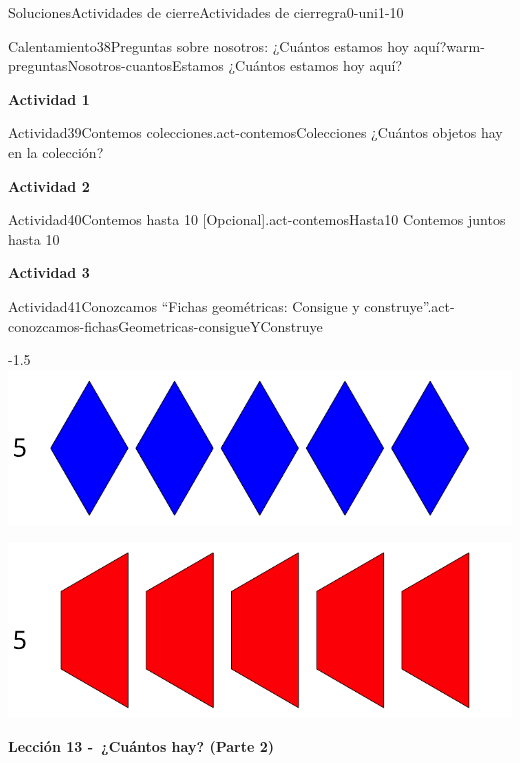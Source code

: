 \documentclass[twoside,10pt,]{article}
\begin{document}
\begin{solutions-section}{Soluciones}{Actividades de cierre}{}{Actividades de cierre}{}{}{gra0-uni1-10}
\begin{explorationsolution}{Calentamiento}{38}{Preguntas sobre nosotros: ¿Cuántos estamos hoy aquí?}{warm-preguntasNosotros-cuantosEstamos}
¿Cuántos estamos hoy aquí?%
\end{explorationsolution}%
\par\medskip
\noindent\textbf{\large{}\space\textperiodcentered\space{}Actividad 1}
\begin{activitysolution}{Actividad}{39}{Contemos colecciones.}{act-contemosColecciones}%
¿Cuántos objetos hay en la colección?%
\end{activitysolution}%
\par\medskip
\noindent\textbf{\large{}\space\textperiodcentered\space{}Actividad 2}
\begin{activitysolution}{Actividad}{40}{Contemos hasta 10 [Opcional].}{act-contemosHasta10}%
Contemos juntos hasta 10%
\end{activitysolution}%
\par\medskip
\noindent\textbf{\large{}\space\textperiodcentered\space{}Actividad 3}
\begin{activitysolution}{Actividad}{41}{Conozcamos “Fichas geométricas: Consigue y construye”.}{act-conozcamos-fichasGeometricas-consigueYConstruye}%
\begin{image}{0}{1}{0}{-1.5\baselineskip}%
\includegraphics[width=\linewidth]{external/svg-source/tikz-file-148183.pdf}
\end{image}%
\begin{image}{0}{1}{0}{}%
\includegraphics[width=\linewidth]{external/svg-source/tikz-file-148184.pdf}
\end{image}%
\end{activitysolution}%
\par\medskip
\noindent\textbf{\large{}\space\textperiodcentered\space{}Lección 13 -~¿Cuántos hay? (Parte 2)\\
}
\end{solutions-section}
\end{document}
